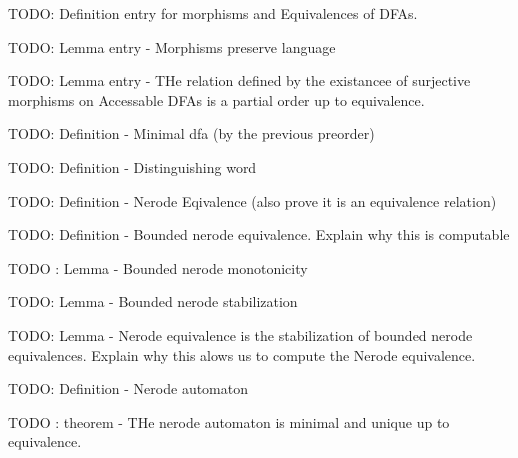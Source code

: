TODO: Definition entry for morphisms and Equivalences of DFAs.

TODO: Lemma entry - Morphisms preserve language

TODO: Lemma entry - THe relation defined by the existancee of surjective morphisms
on Accessable DFAs is a partial order up to equivalence.

TODO: Definition - Minimal dfa (by the previous preorder)

TODO: Definition - Distinguishing word

TODO: Definition - Nerode Eqivalence (also prove it is an equivalence relation)

TODO: Definition - Bounded nerode equivalence. Explain why this is computable

TODO : Lemma - Bounded nerode monotonicity

TODO: Lemma - Bounded nerode stabilization

TODO: Lemma - Nerode equivalence is the stabilization of bounded nerode equivalences.
Explain why this alows us to compute the Nerode equivalence.

TODO: Definition - Nerode automaton

TODO : theorem - THe nerode automaton is minimal and unique up to equivalence.





